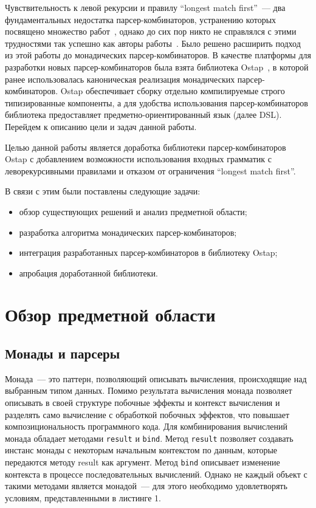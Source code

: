 Чувствительность к левой рекурсии и правилу ``longest match first''~--- два фундаментальных недостатка парсер-комбинаторов, устранению которых посвящено множество работ~\cite{frost,tratt,warth}, однако до сих пор никто не справлялся с этими трудностями так успешно как авторы работы~\cite{meerkat}. Было решено расширить подход из этой работы до монадических парсер-комбинаторов. В качестве платформы для разработки новых парсер-комбинаторов была взята библиотека Ostap~\cite{ostap}, в которой ранее использовалась каноническая реализация монадических парсер-комбинаторов. Ostap обеспечивает сборку отдельно компилируемые строго типизированные компоненты, а для удобства использования парсер-комбинаторов библиотека предоставляет предметно-ориентированный язык (далее DSL).
Перейдем к описанию цели и задач данной работы.

Целью данной работы является доработка библиотеки парсер-комбинаторов Ostap с добавлением возможности использования входных грамматик с леворекурсивными правилами и отказом от ограничения ``longest match first''.

В связи с этим были поставлены следующие задачи:
\begin{itemize}
    \item обзор существующих решений и анализ предметной области;
    \item разработка алгоритма монадических парсер-комбинаторов;
    \item интеграция разработанных парсер-комбинаторов в библиотеку Ostap;
    \item апробация доработанной библиотеки.
\end{itemize}

\section{Обзор предметной области}

\subsection{Монады и парсеры}

Монада~--- это паттерн, позволяющий описывать вычисления, происходящие над выбранным типом данных. Помимо результата вычисления монада позволяет описывать в своей структуре побочные эффекты и контекст вычисления и разделять само вычисление с обработкой побочных эффектов, что повышает композициональность программного кода. Для комбинирования вычислений монада обладает методами \lstinline|result| и \lstinline|bind|. Метод \lstinline|result| позволяет создавать инстанс монады с некоторым начальным контекстом по данным, которые передаются методу result как аргумент. Метод \lstinline|bind| описывает изменение контекста в процессе последовательных вычислений. Однако не каждый объект с такими методами является монадой~--- для этого необходимо удовлетворять условиям, представленными в листинге 1.

